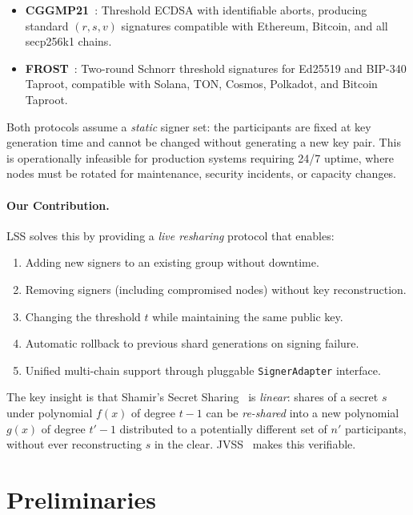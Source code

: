 \documentclass[11pt]{article}
\begin{document}
\begin{itemize}[nosep]
  \item \textbf{CGGMP21}~\cite{cggmp21}: Threshold ECDSA with identifiable aborts, producing standard $(r, s, v)$ signatures compatible with Ethereum, Bitcoin, and all secp256k1 chains.
  \item \textbf{FROST}~\cite{frost}: Two-round Schnorr threshold signatures for Ed25519 and BIP-340 Taproot, compatible with Solana, TON, Cosmos, Polkadot, and Bitcoin Taproot.
\end{itemize}

Both protocols assume a \emph{static} signer set: the participants are fixed at key generation time and cannot be changed without generating a new key pair. This is operationally infeasible for production systems requiring 24/7 uptime, where nodes must be rotated for maintenance, security incidents, or capacity changes.

\paragraph{Our Contribution.} LSS solves this by providing a \emph{live resharing} protocol that enables:
\begin{enumerate}[nosep]
  \item Adding new signers to an existing group without downtime.
  \item Removing signers (including compromised nodes) without key reconstruction.
  \item Changing the threshold $t$ while maintaining the same public key.
  \item Automatic rollback to previous shard generations on signing failure.
  \item Unified multi-chain support through pluggable \texttt{SignerAdapter} interface.
\end{enumerate}

The key insight is that Shamir's Secret Sharing~\cite{shamir1979} is \emph{linear}: shares of a secret $s$ under polynomial $f(x)$ of degree $t - 1$ can be \emph{re-shared} into a new polynomial $g(x)$ of degree $t' - 1$ distributed to a potentially different set of $n'$ participants, without ever reconstructing $s$ in the clear. JVSS~\cite{pedersen1991} makes this verifiable.

\section{Preliminaries}
\end{document}
